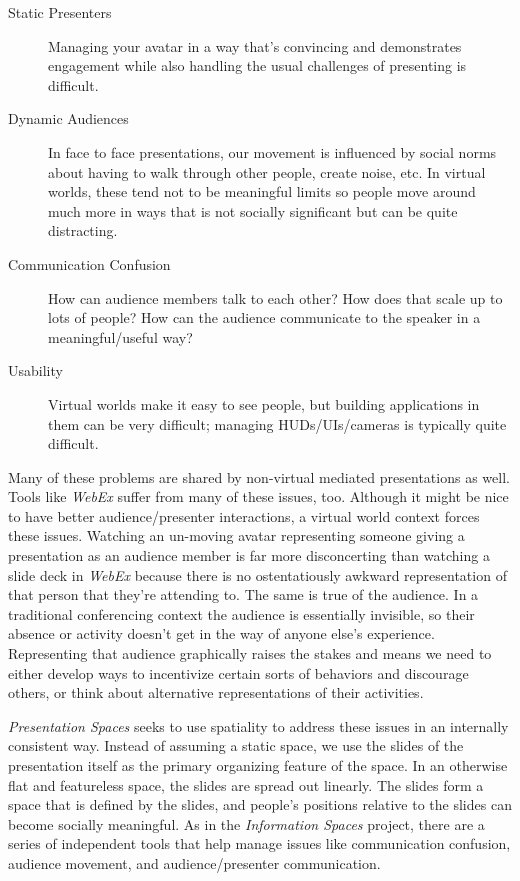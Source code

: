 \begin{description}
\item[Static Presenters]{Managing your avatar in a way that's convincing and demonstrates engagement while also handling the usual challenges of presenting is difficult.}
\item[Dynamic Audiences]{In face to face presentations, our movement is influenced by social norms about having to walk through other people, create noise, etc. In virtual worlds, these tend not to be meaningful limits so people move around much more in ways that is not socially significant but can be quite distracting.}
\item[Communication Confusion]{How can audience members talk to each other? How does that scale up to lots of people? How can the audience communicate to the speaker in a meaningful/useful way?}
\item[Usability]{Virtual worlds make it easy to see people, but building applications in them can be very difficult; managing HUDs/UIs/cameras is typically quite difficult.}
\end{description}

Many of these problems are shared by non-virtual mediated presentations as well. Tools like \emph{WebEx} suffer from many of these issues, too. Although it might be nice to have better audience/presenter interactions, a virtual world context forces these issues. Watching an un-moving avatar representing someone giving a presentation as an audience member is far more disconcerting than watching a slide deck in \emph{WebEx} because there is no ostentatiously awkward representation of that person that they're attending to. The same is true of the audience. In a traditional conferencing context the audience is essentially invisible, so their absence or activity doesn't get in the way of anyone else's experience. Representing that audience graphically raises the stakes and means we need to either develop ways to incentivize certain sorts of behaviors and discourage others, or think about alternative representations of their activities. 

\emph{Presentation Spaces} seeks to use spatiality to address these issues in an internally consistent way. Instead of assuming a static space, we use the slides of the presentation itself as the primary organizing feature of the space. In an otherwise flat and featureless space, the slides are spread out linearly. The slides form a space that is defined by the slides, and people's positions relative to the slides can become socially meaningful. As in the \emph{Information Spaces} project, there are a series of independent tools that help manage issues like communication confusion, audience movement, and audience/presenter communication. 

